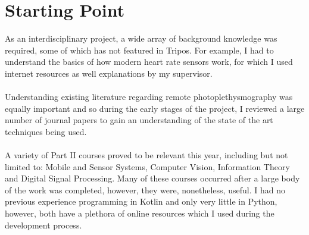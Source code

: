 \section{Starting Point}
As an interdisciplinary project, a wide array of background knowledge was required, some of which has not featured in Tripos.
For example, I had to understand the basics of how modern heart rate sensors work, for which I used internet resources as well explanations by my supervisor.
\\\\
Understanding existing literature regarding remote photoplethysmography was equally important and so during the early stages of the project, I reviewed
a large number of journal papers to gain an understanding of the state of the art techniques being used.
\\\\
A variety of Part II courses proved to be relevant this year, including but not limited to: Mobile and Sensor Systems, Computer Vision, Information Theory and Digital Signal Processing. Many of these courses occurred after a large body of the work was completed, however, they were, nonetheless, useful.
I had no previous experience programming in Kotlin and only very little in Python, however, both have a plethora of online resources which I used 
during the development process.